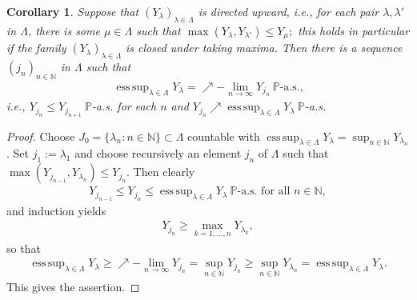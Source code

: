 \documentclass[12pt,a4paper, twoside]{article}
\newtheorem{cor}{Corollary}[section]
\theoremstyle{definition}
\newcommand{\PP}{\mathbb{P}} %
\DeclareMathOperator*{\esssup}{ess\,sup}
\begin{document}
\begin{cor} Suppose that $(Y_\lambda)_{\lambda \in \Lambda}$ is directed upward, i.e.,  for each pair $\lambda, \lambda'$ in $\Lambda$, there is some $\mu \in \Lambda$ such that $\max(Y_\lambda, Y_{\lambda'}) \leq Y_\mu;$ this holds in particular if the family $(Y_\lambda)_{\lambda \in \Lambda}$ is closed under taking maxima. Then there is a sequence $(j_n)_{n \in \mathbb{N}}$ in $\Lambda$ such that
\begin{align*}
\esssup_{ \lambda \in \Lambda} Y_\lambda = \nearrow - \lim_{n \to \infty} Y_{j_n} \ \PP\text{-a.s.,}
\end{align*}
i.e., $Y_{j_n} \leq Y_{j_{n+1}} \ \PP$-a.s. for each $n$ and $Y_{j_n} \nearrow \esssup_{ \lambda \in \Lambda} Y_\lambda \ \PP$-a.s.
\end{cor}
\newpage
\begin{proof}
Choose $J_0 = \{ \lambda_n : n \in \mathbb{N}\} \subset \Lambda$ countable with $\esssup_{ \lambda \in \Lambda} Y_\lambda = \sup_{n \in \mathbb{N}} Y_{\lambda_n}$. Set $j_1:= \lambda_1$ and choose recursively an element $j_n$ of $\Lambda$ such that $\max(Y_{j_{n-1}}, Y_{\lambda_n}) \leq Y_{j_n}.$ Then clearly 
\begin{align*}
Y_{j_{n-1}} \leq Y_{j_n} \leq \esssup_{\lambda \in \Lambda} Y_\lambda \ \PP\text{-a.s. for all } n \in \mathbb{N},
\end{align*}
and induction yields
\begin{align*}
Y_{j_n} \geq \max_{k=1, \dots , n} Y_{\lambda_k},
\end{align*}
so that
\begin{align*}
\esssup_{ \lambda \in \Lambda} Y_\lambda \geq \nearrow-\lim_{n \to \infty} Y_{j_n} = \sup_{n \in \mathbb{N}} Y_{j_n} \geq \sup_{n \in \mathbb{N}} Y_{\lambda_n} = \esssup_{\lambda \in \Lambda} Y_\lambda.
\end{align*}
This gives the assertion.
\end{proof}
\newpage
\end{document}
